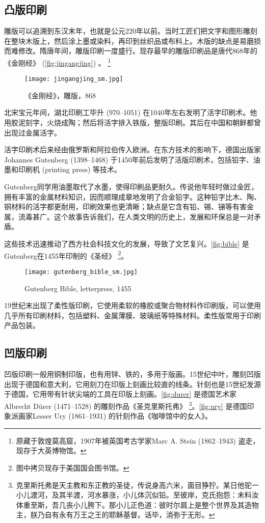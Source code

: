 \subsection{凸版印刷}

雕版可以追溯到东汉末年，也就是公元220年以前。当时工匠们把文字和图形雕刻在整块木版上，然后涂上墨或染料，再印到丝织品或布料上。木版的缺点是易磨损而难修改。隋唐年间，雕版印刷一度盛行。现存最早的雕版印刷品是唐代868年的《金刚经》 (\autoref{fig:jingangjing}) 。 \footnote{原藏于敦煌莫高窟，1907年被英国考古学家Marc A. Stein (1862--1943) 盗走，现存于大英博物馆。}

\begin{figure}[htbp]
\centering
\texttt{[image: jingangjing\_sm.jpg]}
\caption{《金刚经》，雕版，868}
\label{fig:jingangjing}
\end{figure}

北宋宝元年间，湖北印刷工毕升 (970--1051)\indexBiSheng{} 在1040年左右发明了活字印刷术。他用胶泥刻字，火烧成陶；然后将活字排入铁版，整版印刷。其后在中国和朝鲜都曾出现过金属活字。

活字印刷术后来经由俄罗斯和阿拉伯传入欧洲。在东方技术的影响下，德国出版家Johannes Gutenberg (1398--1468)\indexGutenberg{} 于1450年前后发明了活版印刷术，包括铅字、油墨和印刷机 (printing press) 等技术。

Gutenberg同学用油墨取代了水墨，使得印刷品更耐久。传说他年轻时做过金匠，拥有丰富的金属材料知识，因而顺理成章地发明了合金铅字。这种铅字比木、陶、铜材料的活字都更耐用，印刷效果也更清晰；缺点是它含有铅、锡、锑等有害金属，流毒甚广。这个故事告诉我们，在人类文明的历史上，发展和环保总是一对矛盾。

这些技术迅速推动了西方社会科技文化的发展，导致了文艺复兴。\autoref{fig:bible} 是Gutenberg在1455年印制的《圣经》 \footnote{图中拷贝现存于美国国会图书馆。}。

\begin{figure}[htbp]
\centering
\texttt{[image: gutenberg\_bible\_sm.jpg]}
\caption{Gutenberg Bible, letterpress, 1455}
\label{fig:bible}
\end{figure}

19世纪末出现了柔性版印刷，它使用柔软的橡胶或聚合物材料作印刷版，可以使用几乎所有印刷材料，包括塑料、金属薄膜、玻璃纸等特殊材料。柔性版常用于印刷产品包装。

\subsection{凹版印刷}

凹版印刷一般用铜制印版，也有用锌、铁的，多用于版画。15世纪中叶，雕刻凹版出现于德国和意大利，它用刻刀在印版上刻画比较直的线条。针刻也是15世纪发源于德国，它用带有针状尖端的工具在印版上刻画。\autoref{fig:durer} 是德国艺术家Albrecht Dürer (1471--1528)\indexDurer{} 的雕刻作品《圣克里斯托弗》 \footnote{克里斯托弗是天主教和东正教的圣徒，传说身高六米，面目狰狞。某日他驼一小儿渡河，及其半渡，河水暴涨，小儿体沉似铅。至彼岸，克氏抱怨：未料汝体重至斯，吾几丧小儿胯下。那小儿正色道：彼时尔肩上是整个世界及其造物主，朕乃自有永有万王之王的耶稣基督。话毕，消弥于无形。}。\autoref{fig:ury} 是德国印象派画家Lesser Ury (1861--1931)\indexUry{} 的针刻作品《咖啡馆中的女人》。

